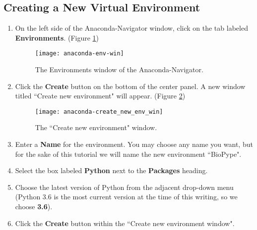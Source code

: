 \subsection{Creating a New Virtual Environment}
    \begin{enumerate}
        \item On the left side of the Anaconda-Navigator window, click on the tab labeled \textbf{Environments}. (Figure \ref{anaconda-env-win}) 
        \begin{figure}
            \texttt{[image: anaconda-env-win]}
            \caption{The Environments window of the Anaconda-Navigator.}
            \label{anaconda-env-win}
        \end{figure}
        \item Click the \textbf{Create} button on the bottom of the center panel. A new window titled ``Create new environment" will appear. (Figure \ref{anaconda-create-new-env-win})
        \begin{figure}[h]
            \begin{center}
            \texttt{[image: anaconda-create\_new\_env\_win]}
            \caption{The ``Create new environment" window.}
            \label{anaconda-create-new-env-win}
            \end{center}
        \end{figure}
        \item Enter a \textbf{Name} for the environment. You may choose any name you want, but for the sake of this tutorial we will name the new environment ``BioPype".
        \item Select the box labeled \textbf{Python} next to the \textbf{Packages} heading.
        \item Choose the latest version of Python from the adjacent drop-down menu (Python 3.6 is the most current version at the time of this writing, so we choose \textbf{3.6}).
        \item Click the \textbf{Create} button within the ``Create new environment window".
    \end{enumerate}

